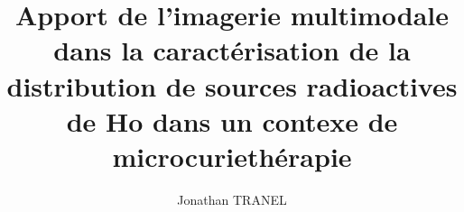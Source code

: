 \documentclass{book}
\title{\textbf{\large Apport de l'imagerie multimodale  dans la caract\'erisation de la distribution de sources radioactives de \up{166}Ho dans un contexe de microcurieth\'erapie}}
\author{Jonathan TRANEL}
\begin{document}
    \makeflyleaf
\end{document}
